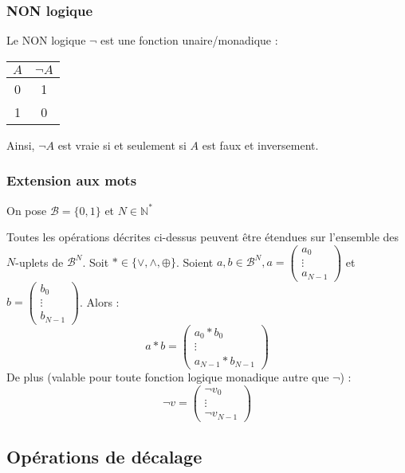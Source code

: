 \documentclass[../../main.tex]{subfiles}
\begin{document}
\subsubsection{NON logique}
\label{ssub:non_logique}
Le NON logique $\neg$ est une fonction unaire/monadique :
\begin{center}
\begin{tabular}{c|c}
$A$ & $\neg{A}$ \\
\hline
0 & 1 \\
1 & 0 \\
\end{tabular}
\end{center}
Ainsi, $\neg{A}$ est vraie si et seulement si $A$ est faux et inversement.
\subsubsection{Extension aux mots}
\label{ssub:extension_aux_mots}
On pose $\mathcal{B} = \{0, 1\}$ et $N\in{\mathbb{N}^{*}}$

Toutes les opérations décrites ci-dessus peuvent être étendues sur l'ensemble des $N$-uplets de $\mathcal{B}^{N}$. \newline
Soit $\ast\in{\{\vee, \wedge, \oplus\}}$. Soient $a, b \in{\mathcal{B}^{N}}, a = \begin{pmatrix}
a_0 \\
\vdots \\
a_{N-1}
\end{pmatrix}$ et $b = \begin{pmatrix}
b_0 \\
\vdots \\
b_{N-1}
\end{pmatrix}$. Alors :
$$a\ast{b} = \begin{pmatrix}
a_0 \ast{b_{0}}\\
\vdots \\
a_{N-1} \ast{b_{N-1}}
\end{pmatrix}$$
De plus (valable pour toute fonction logique monadique autre que $\neg$) :
$$\neg{v} = \begin{pmatrix}
\neg v_{0}\\
\vdots \\
\neg v_{N-1}
\end{pmatrix}$$
\subsection{Opérations de décalage} \label{sub:op_rations_de_d_calage}
\end{document}
